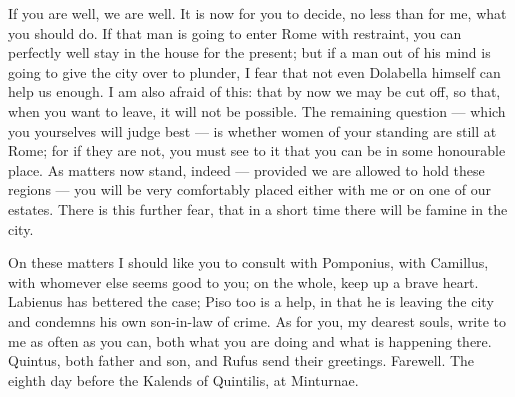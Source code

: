 

 If you are well, we are well. It is now for you to decide, no less than for me, what you should do. If that man is going to enter Rome with restraint, you can perfectly well stay in the house for the present; but if a man out of his mind is going to give the city over to plunder, I fear that not even Dolabella himself can help us enough. I am also afraid of this: that by now we may be cut off, so that, when you want to leave, it will not be possible. The remaining question --- which you yourselves will judge best --- is whether women of your standing are still at Rome; for if they are not, you must see to it that you can be in some honourable place. As matters now stand, indeed --- provided we are allowed to hold these regions --- you will be very comfortably placed either with me or on one of our estates. There is this further fear, that in a short time there will be famine in the city.

 On these matters I should like you to consult with Pomponius, with Camillus, with whomever else seems good to you; on the whole, keep up a brave heart. Labienus has bettered the case; Piso too is a help, in that he is leaving the city and condemns his own son-in-law of crime. As for you, my dearest souls, write to me as often as you can, both what you are doing and what is happening there. Quintus, both father and son, and Rufus send their greetings. Farewell. The eighth day before the Kalends of Quintilis, at Minturnae.
